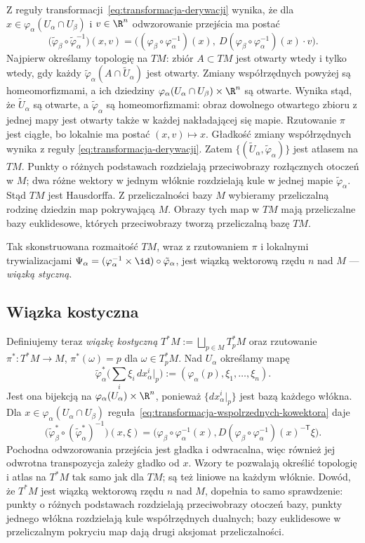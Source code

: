 Z reguły transformacji~\eqref{eq:transformacja-derywacji} wynika,
że dla $x\in\varphi_\alpha(U_\alpha\cap U_\beta)$ i $v\in\R^n$
odwzorowanie przejścia ma postać
\[
\big(\tilde\varphi_\beta\circ\tilde\varphi_\alpha^{-1}\big)(x,v)=\Big(
(\varphi_\beta\circ\varphi_\alpha^{-1})(x),\ D(\varphi_\beta\circ\varphi_\alpha^{-1})(x)
\cdot v\Big).
\]
Najpierw określamy topologię na $TM$: zbiór $A\subset TM$
jest otwarty wtedy i tylko wtedy, gdy każdy
$\tilde\varphi_\alpha(A\cap\tilde U_\alpha)$ jest otwarty.
Zmiany współrzędnych powyżej są homeomorfizmami, a ich dziedziny
$\varphi_\alpha(U_\alpha\cap U_\beta)\times\R^n$ są otwarte.
Wynika stąd, że $\tilde U_\alpha$ są otwarte, a
$\tilde\varphi_\alpha$ są homeomorfizmami: obraz dowolnego otwartego
zbioru z jednej mapy jest otwarty także w każdej nakładającej się mapie.
Rzutowanie $\pi$ jest ciągłe, bo lokalnie ma postać $(x,v)\mapsto x$.
Gładkość zmiany współrzędnych wynika z reguły
\eqref{eq:transformacja-derywacji}. Zatem $\{(\tilde
U_\alpha,\tilde\varphi_\alpha)\}$ jest atlasem na $TM$. Punkty o różnych
podstawach rozdzielają przeciwobrazy rozłącznych otoczeń w $M$;
dwa różne wektory w jednym włóknie rozdzielają kule w jednej mapie
$\tilde\varphi_\alpha$. Stąd $TM$ jest Hausdorffa. Z przeliczalności
bazy $M$ wybieramy przeliczalną rodzinę dziedzin map pokrywającą $M$.
Obrazy tych map w $TM$ mają przeliczalne bazy euklidesowe, których
przeciwobrazy tworzą przeliczalną bazę $TM$.

Tak skonstruowana rozmaitość $TM$, wraz z rzutowaniem $\pi$ i lokalnymi trywializacjami
$\Psi_\alpha=(\varphi_\alpha^{-1}\times\id)\circ\tilde\varphi_\alpha$, jest wiązką
wektorową rzędu $n$ nad $M$ — \emph{wiązką styczną}.

\subsection*{Wiązka kostyczna}

Definiujemy teraz \emph{wiązkę kostyczną}
$T^*M:=\bigsqcup_{p\in M}T_p^*M$ oraz rzutowanie
$\pi^*\colon T^*M\to M$, $\pi^*(\omega)=p$ dla $\omega\in T_p^*M$.
Nad $U_\alpha$ określamy mapę
\[
\tilde\varphi_\alpha^*\Big(\sum_i\xi_i\,dx^i_\alpha|_p\Big)
:=(\varphi_\alpha(p),\xi_1,\ldots,\xi_n).
\]
Jest ona bijekcją na $\varphi_\alpha(U_\alpha)\times\R^n$,
ponieważ $\{dx^i_\alpha|_p\}$ jest bazą każdego włókna.
Dla $x\in\varphi_\alpha(U_\alpha\cap U_\beta)$
reguła~\eqref{eq:transformacja-wspolrzednych-kowektora} daje
\[
\big(\tilde\varphi_\beta^*\circ(\tilde\varphi_\alpha^*)^{-1}\big)(x,\xi)
=\Big(\varphi_\beta\circ\varphi_\alpha^{-1}(x),
D(\varphi_\beta\circ\varphi_\alpha^{-1})(x)^{-\mathsf T}\xi\Big).
\]
Pochodna odwzorowania przejścia jest gładka i odwracalna,
więc również jej odwrotna transpozycja zależy gładko od $x$.
Wzory te pozwalają określić topologię i atlas na $T^*M$
tak samo jak dla $TM$; są też liniowe na każdym włóknie.
Dowód, że $T^*M$ jest wiązką wektorową rzędu $n$ nad $M$,
dopełnia to samo sprawdzenie:
punkty o różnych podstawach rozdzielają przeciwobrazy otoczeń bazy,
punkty jednego włókna rozdzielają kule współrzędnych dualnych; bazy
euklidesowe w przeliczalnym pokryciu map dają drugi aksjomat przeliczalności.

